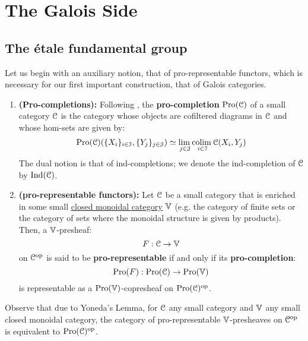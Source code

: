 \section{The Galois Side}
    \subsection{The \'etale fundamental group}
        Let us begin with an auxiliary notion, that of pro-representable functors, which is necessary for our first important construction, that of Galois categories.
        \begin{definition} \label{def: pro_representable_functors}
            \noindent
            \begin{enumerate}
                \item \textbf{(Pro-completions):} Following \cite[Definition 2.1]{isaksen_2001_limits_and_colimits_in_pro_categories}, the \textbf{pro-completion} $\mathrm{Pro}(\mathcal{C})$ of a small category $\mathcal{C}$ is the category whose objects are cofiltered diagrams in $\mathcal{C}$ and whose hom-sets are given by:
                    $$\mathrm{Pro}(\mathcal{C})(\{X_i\}_{i \in \mathcal{I}}, \{Y_j\}_{j \in \mathcal{J}}) \simeq \underset{j \in \mathcal{J}}{\operatorname{lim} \:} \underset{i \in \mathcal{I}}{\operatorname{colim} \:} \mathcal{C}(X_i, Y_j)$$
                The dual notion is that of ind-completions; we denote the ind-completion of $\mathcal{C}$ by $\mathrm{Ind}(\mathcal{C})$.
                \item \textbf{(pro-representable functors):} Let $\mathcal{C}$ be a small category that is enriched in some small \href{http://nlab-pages.s3.us-east-2.amazonaws.com/nlab/show/closed+monoidal+category}{\underline{closed monoidal category}} $\mathbb{V}$ (e.g. the category of finite sets or the category of sets where the monoidal structure is given by products). Then, a $\mathbb{V}$-presheaf:
                    $$F: \mathcal{C} \to \mathbb{V}$$
                on $\mathcal{C}^{\mathrm{op}}$ is said to be \textbf{pro-representable} if and only if its \textbf{pro-completion}:
                    $$\mathrm{Pro}(F): \mathrm{Pro}(\mathcal{C}) \to \mathrm{Pro}(\mathbb{V})$$
                is representable as a $\mathrm{Pro}(\mathbb{V})$-copresheaf on $\mathrm{Pro}(\mathcal{C})^{\mathrm{op}}$.
            \end{enumerate}
        \end{definition}
        \begin{remark} \label{remark: pro_representable_functors_are_ind_objects}
            Observe that due to Yoneda's Lemma, for $\mathcal{C}$ any small category and $\mathbb{V}$ any small closed monoidal category, the category of pro-representable $\mathbb{V}$-presheaves on $\mathcal{C}^{\mathrm{op}}$ is equivalent to $\mathrm{Pro}(\mathcal{C})^{\mathrm{op}}$. 
        \end{remark}
        
